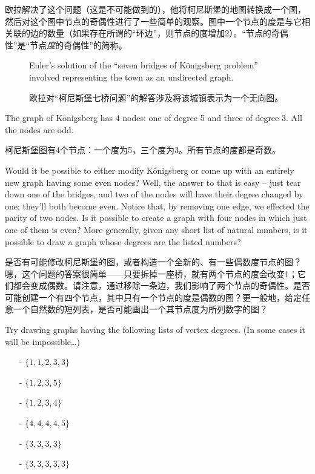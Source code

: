 欧拉解决了这个问题（这是不可能做到的），他将柯尼斯堡的地图转换成一个图，然后对这个图中节点的奇偶性进行了一些简单的观察。图中一个节点的度是与它相关联的边的数量（如果存在所谓的“环边”，则节点的度增加2）。“节点的奇偶性”是“节点\emph{度}的奇偶性”的简称。

\begin{figure}[!hbtp]
\begin{center}

\end{center}
\caption[K\"{o}nigsberg, Prussia as a graph.]{Euler's solution of the ``seven
bridges of K\"{o}nigsberg problem'' involved representing the town
as an undirected graph.}
\caption[普鲁士柯尼斯堡的图表示。]{欧拉对“柯尼斯堡七桥问题”的解答涉及将该城镇表示为一个无向图。}
\label{fig:kon_graph} 
\end{figure}

The graph of K\"{o}nigsberg has 4 nodes: one of degree 5 and three of degree
3.  All the nodes are odd.

柯尼斯堡图有4个节点：一个度为5，三个度为3。所有节点的度都是奇数。

Would it be possible to either modify 
K\"{o}nigsberg or come up with an entirely new graph having some even nodes?
Well, the answer to that is easy -- just tear down one of the bridges, and two
of the nodes will have their degree changed by one; they'll both become even.
Notice that, by removing one edge, we effected the parity of two nodes.  Is
it possible to create a graph with four nodes in which just one of them is
even?  More generally, given any short list of natural numbers, is it 
possible to draw a graph whose degrees are the listed numbers?

是否有可能修改柯尼斯堡的图，或者构造一个全新的、有一些偶数度节点的图？嗯，这个问题的答案很简单——只要拆掉一座桥，就有两个节点的度会改变1；它们都会变成偶数。请注意，通过移除一条边，我们影响了两个节点的奇偶性。是否可能创建一个有四个节点，其中只有一个节点的度是偶数的图？更一般地，给定任意一个自然数的短列表，是否可能画出一个其节点度为所列数字的图？

\begin{exer}
Try drawing graphs having the following lists of vertex degrees.
(In some cases it will be impossible\ldots)

\begin{itemize}
\item[-] $\{1,1,2,3,3\}$
\item[-] $\{1,2,3,5\}$
\item[-] $\{1,2,3,4\}$
\item[-] $\{4,4,4,4,5\}$
\item[-] $\{3,3,3,3\}$
\item[-] $\{3,3,3,3,3\}$
\end{itemize}
\end{exer}   

